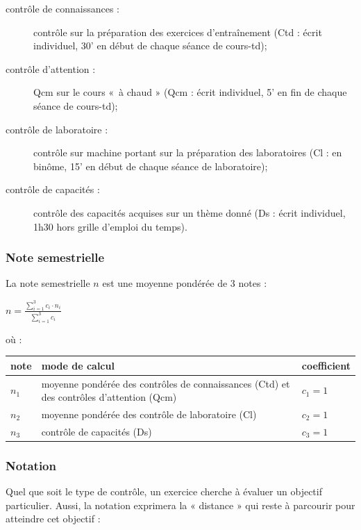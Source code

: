 \documentclass[11pt,a4paper,colorlinks,breaklinks]{article}
\begin{document}
\begin{description}
\item[contrôle de connaissances :] 
	contrôle sur la préparation des exercices d'entraînement
	({\sc Ctd} : écrit individuel, 30' en début de chaque séance de cours-td);
	
\item[contrôle d'attention :] {\sc Qcm}
	sur le cours «~à chaud » ({\sc Qcm} : écrit individuel, 5' en fin de chaque séance de cours-td);
	
\item[contrôle de laboratoire :]
	contrôle sur machine portant sur la préparation des laboratoires ({\sc Cl} : en binôme,
	15' en début de chaque séance de laboratoire);
	
\item[contrôle de capacités :] contrôle
	des capacités acquises sur un thème donné ({\sc Ds} : écrit individuel, 1h30 hors grille
	d'emploi du temps).
\end{description}

\subsubsection{Note semestrielle}
La note semestrielle $n$ est une moyenne pondérée de 3 notes : 

\noindent\begin{minipage}{3cm}
$\displaystyle n = \frac{\displaystyle\sum_{i=1}^3 c_i\cdot n_i}{\displaystyle\sum_{i=1}^3 c_i}$
\end{minipage}
\hfill où :\hfill
{\footnotesize
\begin{tabular}{|l@{ : }p{8cm}|l|}
\hline
note & mode de calcul & coefficient \\
\hline
$n_1$ & moyenne pondérée des contrôles de connaissances ({\sc Ctd}) \newline 
et des contrôles d'attention ({\sc Qcm}) & $c_1 = 1$ \\
$n_2$ & moyenne pondérée des contrôle de laboratoire ({\sc Cl})& $c_2 = 1$ \\
$n_3$ & contrôle de capacités ({\sc Ds}) & $c_3 = 1$\\
\hline
\end{tabular}}

\subsubsection{Notation}
Quel que soit le type de contrôle, un exercice cherche à évaluer un objectif
particulier. Aussi, la notation exprimera la « distance » qui reste à parcourir 
pour atteindre cet objectif : 
\end{document}
